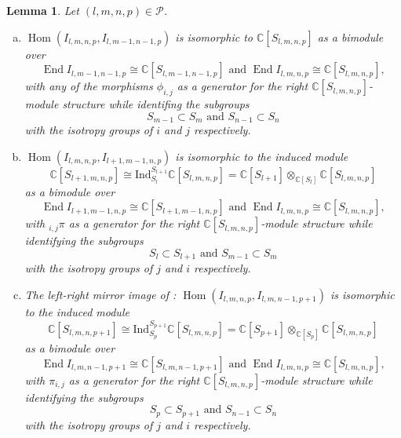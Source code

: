 \documentclass[11pt]{article}
\theoremstyle{plain}
\newtheorem{lemma}{Lemma}[section]
\theoremstyle{nonumberplain}
\theoremstyle{plain}
\numberwithin{equation}{section}
\theoremstyle{nonumberplain}
\newcommand\bC{{\mathbb C}}
\newcommand\cP{{\mathcal P}}
\newcommand\1{{\bf 1}}
\DeclareMathOperator{\End}{\mathrm{End}}
\DeclareMathOperator{\Hom}{\mathrm{Hom}}
\begin{document}
\begin{lemma}\label{le:deg1}
  Let $(l,m,n,p)\in \cP$.
  \begin{enumerate}[(a)]
  \item\label{item:16} $\Hom(I_{l,m,n,p},I_{l,m-1,n-1,p})$ is isomorphic to $\bC[S_{l,m,n,p}]$ as a bimodule over
    \begin{equation*}
      \End I_{l,m-1,n-1,p} \cong \bC [S_{l,m-1,n-1,p} ]\text{ and }\End I_{l,m,n,p}\cong \bC [S_{l,m,n,p}],
    \end{equation*}
    with any of the morphisms $\phi_{i,j}$ as a generator for the right $\bC [S_{l,m,n,p} ]$-module structure while identifing the subgroups
    \begin{equation*}
     S_{m-1}\subset S_{m} \text{ and } S_{n-1} \subset S_{n}
    \end{equation*}
     with the isotropy groups of $i$ and $j$ respectively. 
  \item\label{item:17} $\Hom(I_{l,m,n,p},I_{l+1,m-1,n,p})$ is isomorphic to the induced module
    \begin{equation*}
      \bC [S_{l+1,m,n,p}]\cong \mathrm{Ind}_{S_l}^{S_{l+1}} \bC [S_{l,m,n,p}] = \bC [S_{l+1}]\otimes_{\bC [S_l]}\bC [S_{l,m,n,p}]
    \end{equation*}
    as a bimodule over
    \begin{equation*}
      \End I_{l+1,m-1,n,p}\cong \bC [S_{l+1,m-1,n,p}]\text{ and }\End I_{l,m,n,p} \cong \bC [S_{l,m,n,p}],
    \end{equation*}
    with ${}_{i,j}\pi$ as a generator for the right $\bC [S_{l,m,n,p}]$-module structure while identifying the subgroups
    \begin{equation*}
      S_l\subset S_{l+1}\text{ and } S_{m-1}\subset S_m
    \end{equation*}
    with the isotropy groups of $j$ and $i$ respectively. 
  \item\label{item:18} The left-right mirror image of : $\Hom(I_{l,m,n,p},I_{l,m,n-1,p+1})$ is isomorphic to the induced module
    \begin{equation*}
      \bC [S_{l,m,n,p+1}]\cong \mathrm{Ind}_{S_p}^{S_{p+1}} \bC [S_{l,m,n,p}] = \bC [S_{p+1}]\otimes_{\bC [S_p]}\bC [S_{l,m,n,p}]
    \end{equation*}
    as a bimodule over
    \begin{equation*}
      \End I_{l,m,n-1,p+1}\cong \bC [S_{l,m,n-1,p+1}]\text{ and }\End I_{l,m,n,p}\cong \bC [S_{l,m,n,p}],
    \end{equation*}
    with $\pi_{i,j}$ as a generator for the right $\bC [S_{l,m,n,p}]$-module structure while identifying the subgroups
    \begin{equation*}
      S_p\subset S_{p+1}\text{ and } S_{n-1}\subset S_n
    \end{equation*}
    with the isotropy groups of $j$ and $i$ respectively. 
  \end{enumerate}
\end{lemma}
\end{document}
